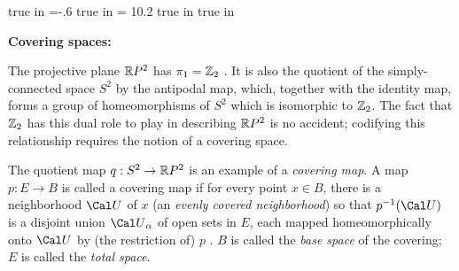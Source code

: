 
\overfullrule=0pt
\parindent=0pt

\nopagenumbers




 true in
\hoffset=-.6 true in
\hsize = 10.2 true in
 true in



\def\cltr{\Red}		  %

\loadmsbm



\def\ctln{\centerline}
\def\u{\underbar}
\def\ssk{\smallskip}
\def\msk{\medskip}
\def\bsk{\bigskip}
\def\hsk{\hskip.1in}
\def\hhsk{\hskip.2in}
\def\dsl{\displaystyle}
\def\hskp{\hskip1.5in}

\def\lra{$\Leftrightarrow$ }
\def\ra{\rightarrow}
\def\mpto{\logmapsto}
\def\pu{\pi_1}
\def\mpu{$\pi_1$}
\def\sig{\Sigma}
\def\msig{$\Sigma$}
\def\ep{\epsilon}
\def\sset{\subseteq}
\def\del{\partial}
\def\inv{^{-1}}
\def\wtl{\widetilde}
\def\del{\partial}
\def\delp{\partial^\prime}
\def\delpp{\partial^{\prime\prime}}
\def\sgn{{\roman{sgn}}}
\def\wtih{\widetilde{H}}
\def\bbz{{\Bbb Z}}
\def\bbr{{\Bbb R}}
\def\rtar{$\Rightarrow$}

\def\cltr{\Red}		  %
\def\cltb{\Blue}		  %
\def\cltg{\PineGreen}	  %



{\bf Covering spaces:}

\msk


The projective plane ${\Bbb R}P^2$
has $\pu = {\Bbb Z}_2$ . It is also the quotient of the simply-connected
space $S^2$ by the antipodal map, which, together with the identity map,
forms a group of homeomorphisms of $S^2$ which is isomorphic to ${\Bbb Z}_2$.
The fact that ${\Bbb Z}_2$ has this dual role to play in describing 
${\Bbb R}P^2$ is no accident; codifying this relationship requires the 
notion of a covering space.

\msk

The quotient map $q:S^2\ra {\Bbb R}P^2$ is an example of a {\it covering map}.
A map $p:E\ra B$ is called a covering map if for every point $x\in B$, there
is a neighborhood ${\Cal U}$ of $x$ (an
{\it evenly covered neighborhood}) so that $p^{-1}({\Cal U})$ 
is a disjoint union ${\Cal U}_\alpha$ of open sets in $E$, each mapped
homeomorphically onto ${\Cal U}$ by (the restriction of) $p$ . $B$ is
called the {\it base space} of the covering; $E$ is called the {\it total
space}. 

